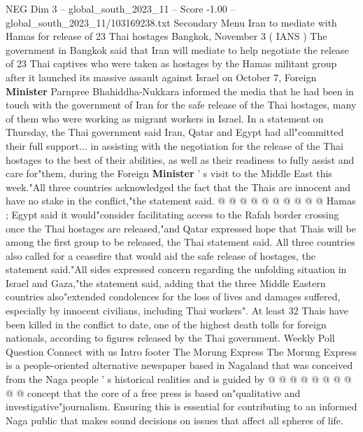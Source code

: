 \begin{textsample}{NEG Dim 3 – global\_south\_2023\_11 – Score -1.00 – global\_south\_2023\_11/103169238.txt}  \label{ex:f3_neg_104}
Secondary Menu Iran to mediate with Hamas for release of 23 Thai hostages Bangkok, November 3 ( IANS ) The government in Bangkok said that Iran will mediate to help negotiate the release of 23 Thai captives who were taken as hostages by the Hamas militant group after it launched its massive assault against Israel on October 7, Foreign \textbf{Minister} Parnpree Bhahiddha-Nukkara informed the media that he had been in touch with the government of Iran for the safe release of the Thai hostages, many of them who were working as migrant workers in Israel.
In a statement on Thursday, the Thai government said Iran, Qatar and Egypt had all"committed their full support... in assisting with the negotiation for the release of the Thai hostages to the best of their abilities, as well as their readiness to fully assist and care for"them, during the Foreign \textbf{Minister} ' s visit to the Middle East this week."All three countries acknowledged the fact that the Thais are innocent and have no stake in the conflict,"the statement said. @ @ @ @ @ @ @ @ @ @ Hamas ; Egypt said it would"consider facilitating access to the Rafah border crossing once the Thai hostages are released,"and Qatar expressed hope that Thais will be among the first group to be released, the Thai statement said.
All three countries also called for a ceasefire that would aid the safe release of hostages, the statement said."All sides expressed concern regarding the unfolding situation in Israel and Gaza,"the statement said, adding that the three Middle Eastern countries also"extended condolences for the loss of lives and damages suffered, especially by innocent civilians, including Thai workers".
At least 32 Thais have been killed in the conflict to date, one of the highest death tolls for foreign nationals, according to figures released by the Thai government.
Weekly Poll Question Connect with us Intro footer The Morung Express The Morung Express is a people-oriented alternative newspaper based in Nagaland that was conceived from the Naga people ' s historical realities and is guided by @ @ @ @ @ @ @ @ @ @ concept that the core of a free press is based on"qualitative and investigative"journalism.
Ensuring this is essential for contributing to an informed Naga public that makes sound decisions on issues that affect all spheres of life.

\end{textsample}
